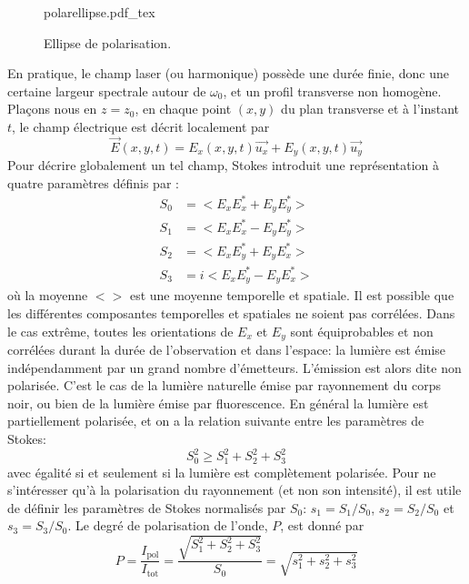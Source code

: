 \begin{figure}
\centering
\def\svgwidth{0.7\textwidth}
{polarellipse.pdf_tex}
\caption{Ellipse de polarisation.}
\label{fig:Polarellipse}
\end{figure}

En pratique, le champ laser (ou harmonique) possède une durée finie, donc une certaine largeur spectrale autour de $\omega_0$, et un profil transverse non homogène. Plaçons nous en $z = z_0$, en chaque point $(x,y)$ du plan transverse et à l'instant $t$, le champ électrique est décrit localement par
\begin{equation}
\vec{E}(x,y,t) = E_x(x,y,t) \vec{u_x} + E_y(x,y,t) \vec{u_y}
\end{equation}
Pour décrire globalement un tel champ, Stokes introduit une représentation à quatre paramètres définis par :
\begin{align}
S_0 & = <E_x E_x^* + E_y E_y^*> \\
S_1 & = <E_x E_x^* - E_y E_y^*> \\
S_2 & = <E_x E_y^* + E_y E_x^*>\\
S_3 & = i <E_x E_y^* - E_y E_x^*>
\end{align}
où la moyenne $< >$ est une moyenne temporelle et spatiale.
Il est possible que les différentes composantes temporelles et spatiales ne soient pas corrélées. Dans le cas extrême, toutes les orientations de $E_x$ et $E_y$ sont équiprobables et non corrélées durant la durée de l'observation et dans l'espace: la lumière est émise indépendamment par un grand nombre d'émetteurs. L'émission est alors dite non polarisée. C'est le cas de la lumière naturelle émise par rayonnement du corps noir, ou bien de la lumière émise par fluorescence. En général la lumière est partiellement polarisée, et on a la relation suivante entre les paramètres de Stokes:
\begin{equation}
S_0^2 \geqslant S_1^2 + S_2^2 + S_3^2
\end{equation}
avec égalité si et seulement si la lumière est complètement polarisée. Pour ne s'intéresser qu'à la polarisation du rayonnement (et non son intensité), il est utile de définir les paramètres de Stokes normalisés par $S_0$: $s_1 = S_1 /S_0$, $s_2 = S_2 /S_0$ et $s_3 = S_3 /S_0$.
Le degré de polarisation de l'onde, $P$, est donné par 
\begin{equation}
P = \frac{I_{\text{pol}}}{I_{\text{tot}}} = \frac{\sqrt{S_1^2 + S_2^2 + S_3^2}}{S_0} = \sqrt{s_1^2 + s_2^2 + s_3^2}
\label{eq:degrépolarisation}
\end{equation}
